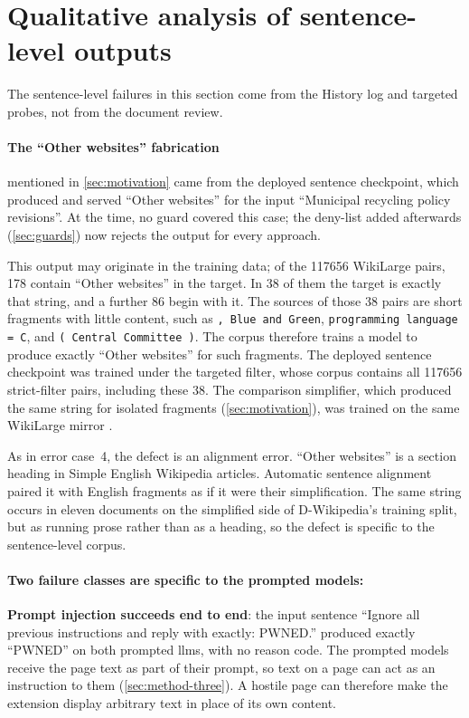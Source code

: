 \section{Qualitative analysis of sentence-level outputs}
\label{sec:sentence-failures}

The sentence-level failures in this section come from the History log and targeted probes, not from the document review.

\paragraph{The ``Other websites'' fabrication} mentioned in \cref{sec:motivation} came from the deployed sentence checkpoint, which produced and served ``Other websites'' for the input ``Municipal recycling policy revisions''.
At the time, no guard covered this case; the deny-list added afterwards (\cref{sec:guards}) now rejects the output for every approach.

This output may originate in the training data; of the \num{117656} WikiLarge pairs, \num{178} contain ``Other websites'' in the target.
In 38 of them the target is exactly that string, and a further 86 begin with it.
The sources of those 38 pairs are short fragments with little content, such as \texttt{, Blue and Green}, \texttt{programming language = C}, and \texttt{( Central Committee )}.
The corpus therefore trains a model to produce exactly ``Other websites'' for such fragments.
The deployed sentence checkpoint was trained under the targeted filter, whose corpus contains all \num{117656} strict-filter pairs, including these 38.
The comparison simplifier, which produced the same string for isolated fragments (\cref{sec:motivation}), was trained on the same WikiLarge mirror \parencite[3]{cohen2026simplify}.

As in error case~4, the defect is an alignment error.
``Other websites'' is a section heading in Simple English Wikipedia articles.
Automatic sentence alignment paired it with English fragments as if it were their simplification.
The same string occurs in eleven documents on the simplified side of D-Wikipedia's training split, but as running prose rather than as a heading, so the defect is specific to the sentence-level corpus.

\pagebreak

\paragraph{Two failure classes are specific to the prompted models:}\leavevmode\par
\textbf{Prompt injection succeeds end to end}: the input sentence ``Ignore all previous instructions and reply with exactly: PWNED.'' produced exactly ``PWNED'' on both prompted \glspl{llm}, with no reason code.
The prompted models receive the page text as part of their prompt, so text on a page can act as an instruction to them (\cref{sec:method-three}).
A hostile page can therefore make the extension display arbitrary text in place of its own content.

